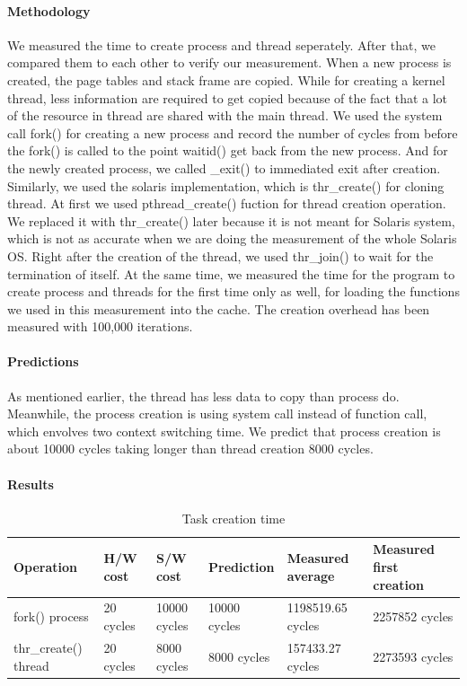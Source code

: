 \paragraph{Methodology}
We measured the time to create process and thread seperately. After that, we compared them to each other to verify our measurement. When a new process is created, the page tables and stack frame are copied. While for creating a kernel thread, less information are required to get copied because of the fact that a lot of the resource in thread are shared with the main thread.
We used the system call fork() for creating a new process and record the number of cycles from before the fork() is called to the point waitid() get back from the new process. And for the newly created process, we called \_exit() to immediated exit after creation.
Similarly, we used the solaris implementation, which is thr\_create() for cloning thread. At first we used pthread\_create() fuction for thread creation operation. We replaced it with thr\_create() later because it is not meant for Solaris system, which is not as accurate when we are doing the measurement of the whole Solaris OS. Right after the creation of the thread, we used thr\_join() to wait for the termination of itself.
At the same time, we measured the time for the program to create process and threads for the first time only as well, for loading the functions we used in this measurement into the cache.
The creation overhead has been measured with 100,000 iterations.



\paragraph{Predictions}

As mentioned earlier, the thread has less data to copy than process do. Meanwhile, the process creation is using system call instead of function call, which envolves two context switching time. We predict that process creation is about 10000 cycles taking longer than thread creation 8000 cycles.






\paragraph{Results}
\begin{table}[h]
\begin{center}
\begin{tabular}{| l | l | l | l | l | l |}
\hline
Operation & H/W cost & S/W cost & Prediction & Measured average & Measured first creation \\
\hline
fork() process 		& 20 cycles & 10000 cycles 	& 10000 cycles& 1198519.65 cycles & 2257852 cycles\\ \hline
thr\_create() thread 	& 20 cycles & 8000 cycles		& 8000 cycles &  157433.27 cycles & 2273593 cycles\\ \hline
\end{tabular}
\end{center}
\caption{Task creation time\label{tab:task-creation}}

\end{table}

